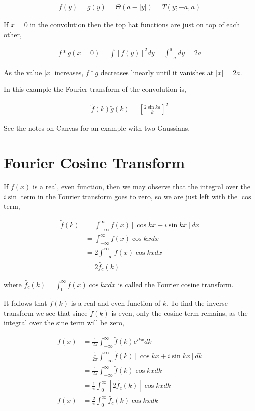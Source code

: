 \documentclass[11pt]{amsart}
\begin{document}
\begin{align*}
  f(y) = g(y) = \Theta{(a - |y|)} = T(y; -a, a)
\end{align*}

If $x = 0$ in the convolution then the top hat functions are just on top of each other,

\begin{align*}
  f*g(x=0) = \int {[f(y)]}^2 dy = \int_{-a}^{a} dy = 2a
\end{align*}

As the value $|x|$ increases, $f * g$ decreases linearly until it vanishes at $|x| = 2a$.

In this example the Fourier transform of the convolution is,

\begin{align*}
  \tilde{f}(k) \tilde{g}(k) = {\left[\frac{2\sin{ka}}{k}\right]}^2
\end{align*}


See the notes on Canvas for an example with two Gaussians.

\section{Fourier Cosine Transform}

If $f(x)$ is a real, even function, then we may observe that the integral over the $i\sin$ term in the Fourier transform goes to zero, so we are just left with the $\cos$ term,

\begin{align*}
  \tilde{f}(k) &= \int_{-\infty}^{\infty} f(x)\left[\cos{kx}-i\sin{kx}\right]dx \\
               &= \int_{-\infty}^{\infty} f(x)\cos{kx} dx \\
               &= 2 \int_{-\infty}^{\infty} f(x)\cos{kx} dx \\
               &= 2 \tilde{f_c}(k)
\end{align*}

where $\tilde{f_c}(k) = \int_0^{\infty}f(x)\cos{kx}dx$ is called the Fourier cosine transform.

It follows that $\tilde{f}(k)$ is a real and even function of $k$. To find the inverse transform we see that since $\tilde{f}(k)$ is even, only the cosine term remains, as the integral over the sine term will be zero,

\begin{align*}
  f(x) &= \frac{1}{2\pi}\int_{-\infty}^{\infty} \tilde{f}(k) e^{ikx} dk \\
       &= \frac{1}{2\pi}\int_{-\infty}^{\infty} \tilde{f}(k) \left[\cos{kx}+i\sin{kx}\right] dk \\
       &= \frac{1}{2\pi}\int_{-\infty}^{\infty} \tilde{f}(k) \cos{kx} dk \\
       &= \frac{1}{\pi}\int_0^{\infty} \left[2\tilde{f_c}(k)\right] \cos{kx} dk \\
  f(x) &= \frac{2}{\pi}\int_0^{\infty} \tilde{f_c}(k) \cos{kx} dk
\end{align*}
\end{document}
